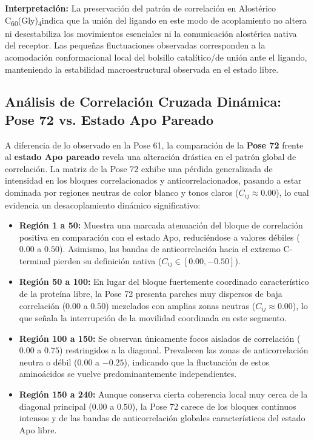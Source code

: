 \textbf{Interpretación:} La preservación del patrón de correlación en Alostérico C\textsubscript{60}(Gly)\textsubscript{4}indica que la unión del ligando en este modo de acoplamiento no altera ni desestabiliza los movimientos esenciales ni la comunicación alostérica nativa del receptor. Las pequeñas fluctuaciones observadas corresponden a la acomodación conformacional local del bolsillo catalítico/de unión ante el ligando, manteniendo la estabilidad macroestructural observada en el estado libre.

\subsection*{Análisis de Correlación Cruzada Dinámica: Pose 72 vs. Estado Apo Pareado}

A diferencia de lo observado en la Pose 61, la comparación de la \textbf{Pose 72} frente al \textbf{estado Apo pareado} revela una alteración drástica en el patrón global de correlación. La matriz de la Pose 72 exhibe una pérdida generalizada de intensidad en los bloques correlacionados y anticorrelacionados, pasando a estar dominada por regiones neutras de color blanco y tonos claros ($C_{ij} \approx 0.00$), lo cual evidencia un desacoplamiento dinámico significativo:

\begin{itemize}
    \item \textbf{Región 1 a 50:} Muestra una marcada atenuación del bloque de correlación positiva en comparación con el estado Apo, reduciéndose a valores débiles ($0.00$ a $0.50$). Asimismo, las bandas de anticorrelación hacia el extremo C-terminal pierden su definición nativa ($C_{ij} \in [0.00, -0.50]$).
    
    \item \textbf{Región 50 a 100:} En lugar del bloque fuertemente coordinado característico de la proteína libre, la Pose 72 presenta parches muy dispersos de baja correlación ($0.00$ a $0.50$) mezclados con amplias zonas neutras ($C_{ij} \approx 0.00$), lo que señala la interrupción de la movilidad coordinada en este segmento.
    
    \item \textbf{Región 100 a 150:} Se observan únicamente focos aislados de correlación ($0.00$ a $0.75$) restringidos a la diagonal. Prevalecen las zonas de anticorrelación neutra o débil ($0.00$ a $-0.25$), indicando que la fluctuación de estos aminoácidos se vuelve predominantemente independientes.
    
    \item \textbf{Región 150 a 240:} Aunque conserva cierta coherencia local muy cerca de la diagonal principal ($0.00$ a $0.50$), la Pose 72 carece de los bloques continuos intensos y de las bandas de anticorrelación globales característicos del estado Apo libre.
\end{itemize}

